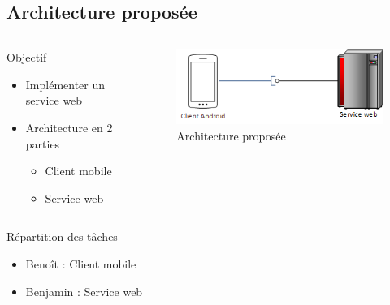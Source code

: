 \documentclass{beamer} %
\begin{document}
  \subsection{Architecture proposée}
  \begin{frame}{\subsecname}

    \begin{columns}
      \begin{column}{0.5\textwidth}
        \begin{exampleblock}{Objectif}
          \begin{itemize}
            \item Implémenter un service web
            \item Architecture en 2 parties
            \begin{itemize}
              \item Client mobile
              \item Service web
            \end{itemize}
          \end{itemize}
        \end{exampleblock}
      \end{column}
      \begin{column}{0.5\textwidth}
        \begin{figure}
        \includegraphics[width=\linewidth, height=\textheight, keepaspectratio]{archi_finale.png}
        \caption{Architecture proposée}
        \end{figure}
      \end{column}
    \end{columns}

    \begin{block}{Répartition des tâches}
      \begin{itemize}
        \item Benoît : Client mobile
        \item Benjamin : Service web
      \end{itemize}
    \end{block}
  \end{frame}
\end{document}
